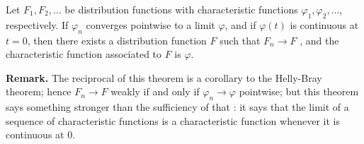 \documentclass[12pt]{article}
\begin{document}
Let $F_1,F_2,\dots$ be distribution functions with characteristic functions
$\varphi_1,\varphi_2,\dots$, respectively. If $\varphi_n$ converges pointwise
to a limit $\varphi$, and if $\varphi(t)$ is continuous at $t=0$, then
there exists a distribution function $F$ such that $F_n\rightarrow F$ , and the characteristic function associated to $F$ is $\varphi$.

\textbf{Remark.} The reciprocal of this theorem is a  corollary to the Helly-Bray theorem; hence $F_n\rightarrow F$ weakly if and only if $\varphi_n\rightarrow\varphi$ pointwise; but this theorem says something stronger than the sufficiency of that : it says that the limit of a sequence of characteristic functions is a characteristic function whenever it is continuous at 0.
\end{document}
